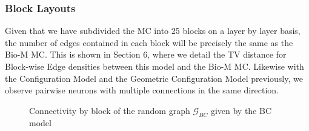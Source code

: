 \subsubsection{Block Layouts}
Given that we have subdivided the MC into 25 blocks on a layer by layer basis, the number of edges contained in each block will be precisely the same as the Bio-M MC. This is shown in Section 6, where we detail the TV distance for Block-wise Edge densities between this model and the Bio-M MC. Likewise with the Configuration Model and the Geometric Configuration Model previously, we observe pairwise neurons with multiple connections in the same direction.
\begin{figure}[H]%
    \centering
    \captionsetup{justification=centering}
    \qquad
    \caption{Connectivity by block of the random graph $\mathcal{G}_{BC}$ given by the BC model}%
    \label{fig:example}%
\end{figure}
